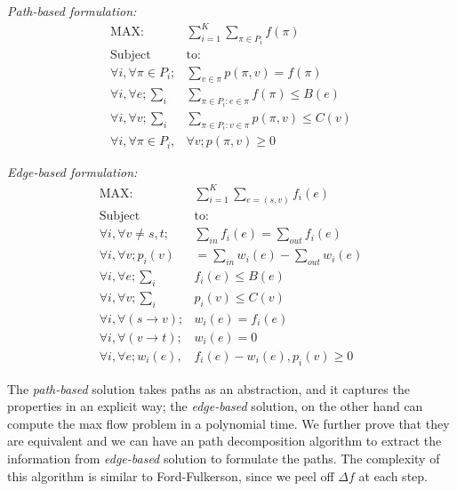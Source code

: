 \begin{minipage}[t]{0.45\textwidth}
\textit{Path-based formulation:}
  \begin{subequations}
\begin{align}
\text{MAX:}& \sum\limits_{i=1}^K\sum\limits_{\pi\in P_i}f(\pi) \\  \nonumber
\text{Subject } &\text{to:} \\
\forall i,\forall \pi\in P_i; &\sum \limits_{v\in \pi} p(\pi, v) = f(\pi)\\
\forall i,\forall e; \sum\limits_i&\sum \limits_{\pi\in P_i:e\in \pi} f(\pi) \leq B(e)\\
\forall i,\forall v; \sum\limits_i&\sum \limits_{\pi\in P_i: v\in\pi}  p(\pi, v) \leq C(v)\\
\forall i,\forall \pi\in P_i,&\forall v;p(\pi,v) \geq 0
\end{align}
\end{subequations}
  \end{minipage}
\hspace{0cm}
\begin{minipage}[t]{0.50\textwidth}
\textit{Edge-based formulation:}
  \begin{subequations}
\begin{align}
\text{MAX:}&\sum\limits_{i=1}^K\sum \limits_{e=(s,v)} f_i(e)  \\ \nonumber
\text{Subject } &\text{to:}\\
\forall i, \forall v \not= s,t;& \sum\limits_{in}  f_i(e)=  \sum\limits_{out} f_i(e)\\
\forall i,\forall v; p_i(v)& = \sum\limits_{in} w_i(e) - \sum\limits_{out} w_i(e) \\
\forall i,\forall e;  \sum\limits_i& f_i(e)\leq B(e)\\
\forall i,\forall v;  \sum\limits_i& p_i(v) \leq C(v)\\
\forall i,\forall (s\rightarrow v);& w_i (e)= f_i (e)\\
\forall i,\forall (v\rightarrow t);& w_i (e)= 0\\
\forall i,\forall e;w_i (e),& f_i (e)-w_i (e), p_i (v) \geq 0
\end{align}
\end{subequations}
\end{minipage}
The \emph{path-based} solution takes paths as an abstraction, and it captures the properties in an explicit way; the \emph{edge-based} solution, on the other hand can compute the max flow problem in a polynomial time. We further prove that they are equivalent and we can have an path decomposition algorithm to extract the information from \emph{edge-based} solution to formulate the paths. The complexity of this algorithm is similar to Ford-Fulkerson, since we peel off $\Delta f$ at each step.


